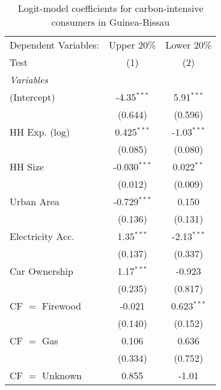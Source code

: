
\begin{table}[htbp!]
   \centering
   \small
   \begin{adjustbox}{width = 1\textwidth, max height = 0.95\textheight, center}
      \begin{threeparttable}[b]
         \caption{\label{tab:Logit_1_GNB} Logit-model coefficients for carbon-intensive consumers in Guinea-Bissau}
         \begin{tabular}{lcc}
            \tabularnewline \midrule \midrule
            Dependent Variables: & Upper 20\%     & Lower 20\%\\   
            Test                 & (1)            & (2)\\  
            \midrule
            \emph{Variables}\\
            (Intercept)          & -4.35$^{***}$  & 5.91$^{***}$\\   
                                 & (0.644)        & (0.596)\\   
            HH Exp. (log)        & 0.425$^{***}$  & -1.03$^{***}$\\   
                                 & (0.085)        & (0.080)\\   
            HH Size              & -0.030$^{***}$ & 0.022$^{**}$\\   
                                 & (0.012)        & (0.009)\\   
            Urban Area           & -0.729$^{***}$ & 0.150\\   
                                 & (0.136)        & (0.131)\\   
            Electricity Acc.     & 1.35$^{***}$   & -2.13$^{***}$\\   
                                 & (0.137)        & (0.337)\\   
            Car Ownership        & 1.17$^{***}$   & -0.923\\   
                                 & (0.235)        & (0.817)\\   
            CF $=$ Firewood      & -0.021         & 0.623$^{***}$\\   
                                 & (0.140)        & (0.152)\\   
            CF $=$ Gas           & 0.106          & 0.636\\   
                                 & (0.334)        & (0.752)\\   
            CF $=$ Unknown       & 0.855          & -1.01\\   

\end{tabular}
\end{threeparttable}
\end{adjustbox}
\end{table}
